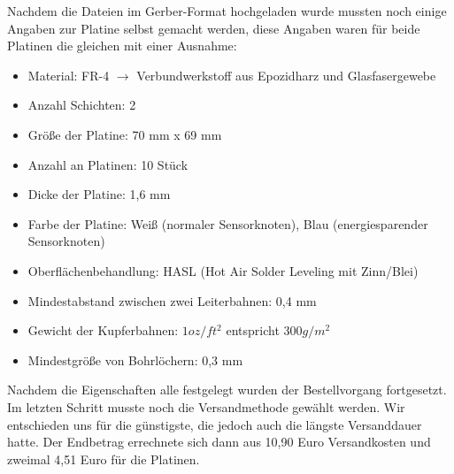 Nachdem die Dateien im Gerber-Format hochgeladen wurde mussten noch einige Angaben zur Platine selbst gemacht werden, diese Angaben waren für beide Platinen die gleichen mit einer Ausnahme:
\begin{itemize}
	\item Material: FR-4 $\rightarrow$ Verbundwerkstoff aus Epozidharz und Glasfasergewebe
	\item Anzahl Schichten: 2
	\item Größe der Platine: 70 mm x 69 mm
	\item Anzahl an Platinen: 10 Stück
	\item Dicke der Platine: 1,6 mm
	\item Farbe der Platine: Weiß (normaler Sensorknoten), Blau (energiesparender Sensorknoten) 
	\item Oberflächenbehandlung: HASL (Hot Air Solder Leveling mit Zinn/Blei)
	\item Mindestabstand zwischen zwei Leiterbahnen: 0,4 mm
	\item Gewicht der Kupferbahnen: $1 oz/ft^2$  entspricht $300 g/m^2$
	\item Mindestgröße von Bohrlöchern: 0,3 mm
\end{itemize}
Nachdem die Eigenschaften alle festgelegt wurden der Bestellvorgang fortgesetzt. Im letzten Schritt musste noch die Versandmethode gewählt werden. Wir entschieden uns für die günstigste, die jedoch auch die längste Versanddauer hatte. Der Endbetrag errechnete sich dann aus 10,90 Euro Versandkosten und zweimal 4,51 Euro für die Platinen.

